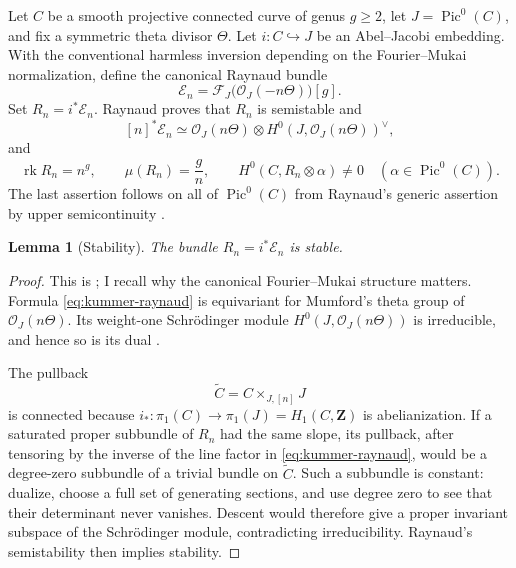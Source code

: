 \documentclass[11pt,reqno]{amsart}
\numberwithin{equation}{section}
\newtheorem{lemma}[theorem]{Lemma}
\theoremstyle{definition}
\theoremstyle{remark}
\newcommand{\Z}{\mathbf Z}
\newcommand{\OO}{\mathcal O}
\newcommand{\rk}{\operatorname{rk}}
\newcommand{\Pic}{\operatorname{Pic}}
\begin{document}
Let $C$ be a smooth projective connected curve of genus $g\ge2$, let
$J=\Pic^0(C)$, and fix a symmetric theta divisor $\Theta$.  Let
$i:C\hookrightarrow J$ be an Abel--Jacobi embedding.  With the conventional harmless inversion depending on the Fourier--Mukai normalization, define the canonical Raynaud bundle
\begin{equation}\label{eq:FM-raynaud}
\mathscr E_n=\mathcal F_J\bigl(\OO_J(-n\Theta)\bigr)[g].
\end{equation}
Set $R_n=i^*\mathscr E_n$.  Raynaud proves that $R_n$ is semistable and
\begin{equation}\label{eq:kummer-raynaud}
[n]^*\mathscr E_n\simeq
\OO_J(n\Theta)\otimes H^0(J,\OO_J(n\Theta))^\vee,
\end{equation}
and
\begin{equation}\label{eq:raynaud-properties}
\rk R_n=n^g,
\qquad \mu(R_n)=\frac gn,
\qquad H^0(C,R_n\otimes\alpha)\ne0
\quad(\alpha\in\Pic^0(C)).
\end{equation}
The last assertion follows on all of $\Pic^0(C)$ from Raynaud's generic assertion by upper semicontinuity \cite{Raynaud1982}.

\begin{lemma}[Stability]\label{lem:raynaud-stable}
The bundle $R_n=i^*\mathscr E_n$ is stable.
\end{lemma}

\begin{proof}
This is \cite[Corollary~2.2]{Schneider2007}; I recall why the canonical Fourier--Mukai structure matters.  Formula \eqref{eq:kummer-raynaud} is equivariant for Mumford's theta group of $\OO_J(n\Theta)$.  Its weight-one Schr\"odinger module $H^0(J,\OO_J(n\Theta))$ is irreducible, and hence so is its dual \cite[Proposition~2.1(3)]{Schneider2007}.

The pullback
\[
\widetilde C=C\times_{J,[n]}J
\]
is connected because $i_*:\pi_1(C)\to\pi_1(J)=H_1(C,\Z)$ is abelianization.  If a saturated proper subbundle of $R_n$ had the same slope, its pullback, after tensoring by the inverse of the line factor in \eqref{eq:kummer-raynaud}, would be a degree-zero subbundle of a trivial bundle on $\widetilde C$.  Such a subbundle is constant: dualize, choose a full set of generating sections, and use degree zero to see that their determinant never vanishes.  Descent would therefore give a proper invariant subspace of the Schr\"odinger module, contradicting irreducibility.  Raynaud's semistability then implies stability.
\end{proof}
\end{document}
